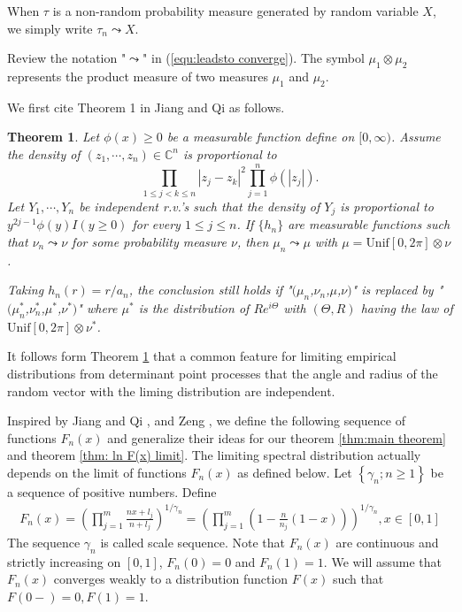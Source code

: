 \documentclass[12pt]{article}
\theoremstyle{plain}
\newtheorem{thm}{\textbf{Theorem}}
\theoremstyle{definition}
\theoremstyle{remark}
\begin{document}
When $\tau$ is a non-random probability measure generated by random variable $X$, we simply write $\tau_n\leadsto X$. 

Review the notation "$\leadsto$" in (\ref{equ:leadsto converge}).
The symbol $\mu_1\otimes \mu_2$ represents the product measure of two measures $\mu_1$ and $\mu_2$.

We first cite Theorem 1 in Jiang and Qi \cite{JiangQi2019} as follows.

\begin{thm}\label{thm:nonlinear}
Let $\phi(x)\geq 0$ be a measurable function define on $[0,\infty)$. Assume the density of $(z_1,\cdots,z_n)\in \mathbb{C}^n$ is proportional to $$\prod_{1\leq j<k\leq n} |z_j-z_k|^2\prod_{j=1}^n\phi (|z_j|).$$
Let $Y_1,\cdots,Y_n$ be independent r.v.'s such that the density of $Y_j$ is proportional to $y^{2j-1}\phi(y)I(y\geq 0)$ for every $1\leq j\leq n$. If $\{ h_n \}$ are measurable functions such that $\nu_n\leadsto \nu$ for some probability measure $\nu$, then $\mu_n\leadsto \mu$ with $\mu=\text{Unif}[0,2\pi]\otimes \nu$. 

Taking $h_n(r)=r/a_n$, the conclusion still holds if "$(\mu_n$,$\nu_n$,$\mu$,$\nu)$" is replaced by "$(\mu_n^*$,$\nu_n^*$,$\mu^*$,$\nu^*)$" where $\mu^*$ is the distribution of $Re^{i\Theta}$ with $(\Theta,R)$ having the law of $\text{Unif}[0,2\pi]\otimes \nu^*$.
\end{thm}
It follows form Theorem \ref{thm:nonlinear} that a common feature for limiting empirical distributions from determinant point processes that the angle and radius of the random vector with the liming distribution are independent.

Inspired by Jiang and Qi \cite{JiangQi2019}, and Zeng \cite{zeng2016}, we define the following sequence of functions $F_n(x)$ and generalize their ideas for our theorem \ref{thm:main theorem} and theorem \ref{thm: ln F(x) limit}. The limiting spectral distribution actually depends on the limit of functions $F_n(x)$ as defined below.
Let $\left\{\gamma_{n} ;  n \geq 1\right\}$ be a sequence of positive numbers. Define
\begin{eqnarray*}
	F_{n}(x)=\left(\prod_{j=1}^{m} \frac{nx+l_{j} }{n+l_{j}}\right)^{1 / \gamma_{n}}=
	\left(\prod_{j=1}^{m} (1-\frac{n}{n_j}(1-x))\right) ^{1 / \gamma_{n}},  x \in[0,1]
\end{eqnarray*}
The sequence  $\gamma_{n}$ is called scale sequence.
Note that $F_n(x)$ are continuous and strictly increasing on $[0,1]$, $F_{n}(0)=0$ and $F_{n}(1)=1$. We will assume that $F_n(x)$ converges weakly to a distribution function $F(x)$ such that $F(0-)=0, F(1)=1$.
\end{document}
